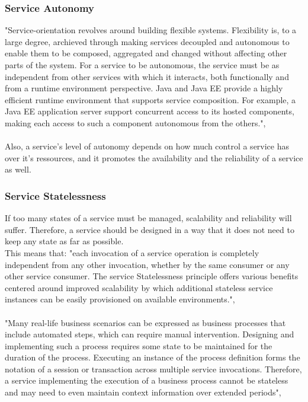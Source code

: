 \documentclass[12pt]{article}
\begin{document}
\subsubsection{Service Autonomy}
"Service-orientation revolves around building flexible systems. Flexibility is, to a large degree, archieved through making services decoupled and autonomous to enable them to be composed, aggregated and changed without affecting other parts of the system. For a service to be autonomous, the service must be as independent from other services with which it interacts, both functionally and from a runtime environment perspective. Java and Java EE provide a highly efficient runtime environment that supports service composition. For example, a Java EE application server support concurrent access to its hosted components, making each access to such a component autonomous from the others.", \cite[page 194]{grau}\\\\
Also, a service's level of autonomy depends on how much control a service has over it's ressources, and it promotes the availability and the reliability of a service as well. \cite[page 88]{te}
\subsubsection{Service Statelessness}
If too many states of a service must be managed, scalability and reliability will suffer. Therefore, a service should be designed in a way that it does not need to keep any state as far as possible. \cite[page 88]{te}\\
This means that: "each invocation of a service operation is completely independent from any other invocation, whether by the same consumer or any other service consumer. The service Statelessness principle offers various benefits centered around improved scalability by which additional stateless service instances can be easily provisioned on available environments.", \cite[page 197]{grau}\\
\\
"Many real-life business scenarios can be expressed as business processes that include automated steps, which can require manual intervention. Designing and implementing such a process requires some state to be maintained for the duration of the process. Executing an instance of the process definition forms the notation of a session or transaction across multiple service invocations. Therefore, a service implementing the execution of a business process cannot be stateless and may need to even maintain context information over extended periods",\cite[page 197]{grau}
\end{document}

